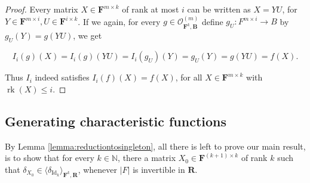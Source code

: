 \documentclass[11pt]{amsart}
\theoremstyle{plain}
\newtheorem{lemma}[thm]{Lemma}
\theoremstyle{definition}
\newcommand{\N}{{\mathbb N}}
\newcommand{\F}{{\mathbf F}}
\newcommand{\alg}[1]{\mathbf{#1}}
\newcommand{\clonoid}[1]{\mathcal{#1}}
\newcommand{\clodO}{\clonoid{O}}
\newcommand{\algB}{\alg{B}}
\newcommand{\algR}{\alg{R}}
\DeclareMathOperator{\rk}{rk}
\DeclareMathOperator{\Id}{Id}
\begin{document}
\begin{proof}
Every matrix $X \in \F^{m \times k}$ of rank at most $i$ can be written as $X = YU$, for $Y \in \F^{m \times i}, U \in \F^{i \times k}$. If we again, for every $g \in \clodO_{\F^k,\algB}^{(m)}$ define $g_U \colon F^{m \times i} \rightarrow B$ by $g_U(Y) = g(YU)$, we get 

$$I_i(g)(X) =  I_i(g)(YU) = I_i(g_U)(Y) = g_U(Y) = g(YU) = f(X).$$

Thus $I_i$ indeed satisfies $I_i(f)(X) = f(X)$, for all $X \in \F^{m\times k}$ with $\rk(X) \leq i$.
\end{proof}






\subsection{Generating characteristic functions} \label{sect:charfun}


By Lemma \ref{lemma:reductiontosingleton}, all there is left to prove our main result, is to show that for every $k\in \N$, there a matrix $X_0 \in \F^{(k+1)\times k}$ of rank $k$ such that $\delta_{X_0} \in \langle \delta_{\Id_k} \rangle_{\F^k,\algR}$, whenever $|F|$ is invertible in $\algR$.
\end{document}
